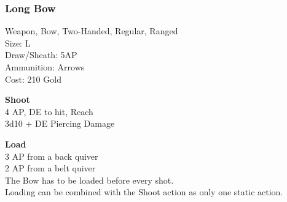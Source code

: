 \subsubsection{Long Bow}\label{weapon:longBow}
Weapon, Bow, Two-Handed, Regular, Ranged\\
Size: L\\
Draw/Sheath: 5AP\\
Ammunition: Arrows\\
Cost: 210 Gold

\textbf{Shoot}\\
4 AP, DE to hit,  Reach\\
3d10 + \texttimes DE Piercing Damage

\textbf{Load}\\
3 AP from a back quiver\\
2 AP from a belt quiver\\
The Bow has to be loaded before every shot.\\
Loading can be combined with the Shoot action as only one static action.
